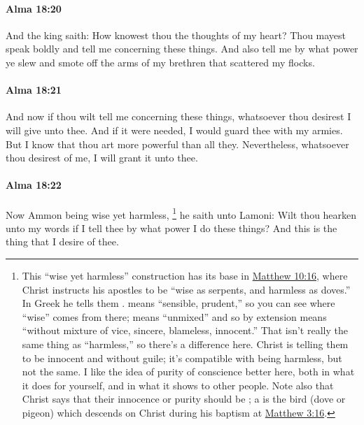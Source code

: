 		\paragraph{Alma 18:20} %
			\label{ALMA-18-20}

			And the king saith:
			How knowest thou the thoughts of my heart?
			Thou mayest speak boldly and tell me concerning these things.
			And also tell me by what power
			ye slew and smote off	 the arms of my brethren that scattered my flocks.

		\paragraph{Alma 18:21} %
			\label{ALMA-18-21}

			And now if thou wilt tell me concerning these things,
			whatsoever thou desirest I will give unto thee.
			And if it were needed, I would guard thee with my armies.
			But I know that thou art more powerful than all they.
			Nevertheless, whatsoever thou desirest of me,
			I will grant it unto thee.

		\paragraph{Alma 18:22} %
			\label{ALMA-18-22}
			
			Now Ammon being wise yet harmless,%
				\footnote{%
					This ``wise yet harmless'' construction has its base in \hyperref[MATTHEW-10-16]{Matthew 10:16}, where Christ instructs his apostles to be ``wise as serpents, and harmless as doves.'' In Greek he tells them .  means ``sensible, prudent,'' so you can see where ``wise'' comes from there;  means ``unmixed'' and so by extension means ``without mixture of vice, sincere, blameless, innocent.'' That isn't really the same thing as ``harmless,'' so there's a difference here. Christ is telling them to be innocent and without guile; it's compatible with being harmless, but not the same. I like the idea of purity of conscience better here, both in what it does for yourself, and in what it shows to other people. Note also that Christ says that their innocence or purity should be ; a  is the bird (dove or pigeon) which descends on Christ during his baptism at \hyperref[MATTHEW-3-16]{Matthew 3:16}.
					}
			he saith unto Lamoni:
			Wilt thou hearken unto my words
			if I tell thee by what power I do these things?
			And this is the thing that I desire of thee.

